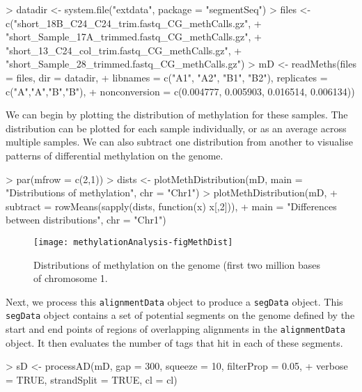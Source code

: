 \documentclass[a4paper]{article}
\begin{document}
\begin{Schunk}
\begin{Sinput}
> datadir <- system.file("extdata", package = "segmentSeq")
> files <- c("short_18B_C24_C24_trim.fastq_CG_methCalls.gz",
+ "short_Sample_17A_trimmed.fastq_CG_methCalls.gz",
+ "short_13_C24_col_trim.fastq_CG_methCalls.gz",
+ "short_Sample_28_trimmed.fastq_CG_methCalls.gz")
> mD <- readMeths(files = files, dir = datadir,
+ libnames = c("A1", "A2", "B1", "B2"), replicates = c("A","A","B","B"),
+ nonconversion = c(0.004777, 0.005903, 0.016514, 0.006134))
\end{Sinput}
\end{Schunk}

We can begin by plotting the distribution of methylation for these samples. The distribution can be plotted for each sample individually, or as an average across multiple samples. We can also subtract one distribution from another to visualise patterns of differential methylation on the genome.

\begin{Schunk}
\begin{Sinput}
> par(mfrow = c(2,1))
> dists <- plotMethDistribution(mD, main = "Distributions of methylation", chr = "Chr1")
> plotMethDistribution(mD, 
+                      subtract = rowMeans(sapply(dists, function(x) x[,2])), 
+                      main = "Differences between distributions", chr = "Chr1")
\end{Sinput}
\end{Schunk}

\begin{figure}[!ht]
\begin{center}
\texttt{[image: methylationAnalysis-figMethDist]}
\caption{Distributions of methylation on the genome (first two million bases of chromosome 1.}
\label{fig:Seg}
\end{center}
\end{figure}


Next, we process this \verb'alignmentData' object to produce a \verb'segData' object. This \verb'segData' object contains a set of potential segments on the genome defined by the start and end points of regions of overlapping alignments in the \verb'alignmentData' object. It then evaluates the number of tags that hit in each of these segments.

\begin{Schunk}
\begin{Sinput}
> sD <- processAD(mD, gap = 300, squeeze = 10, filterProp = 0.05, 
+                 verbose = TRUE, strandSplit = TRUE, cl = cl)
\end{Sinput}
\end{Schunk}
\end{document}
